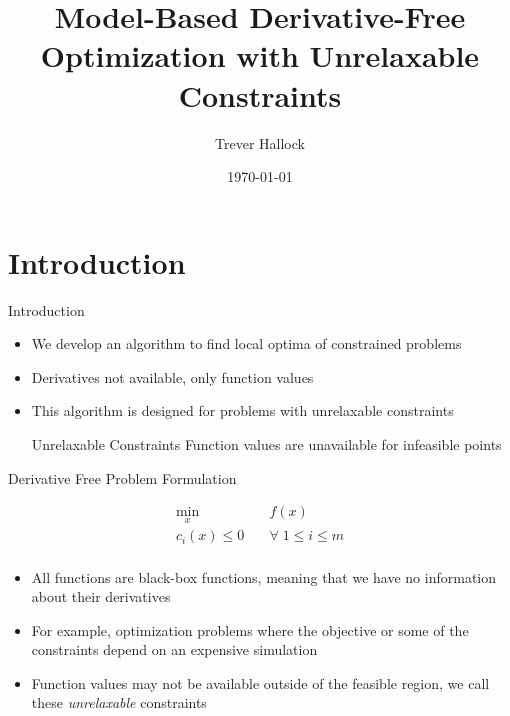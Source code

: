 \documentclass{beamer}
\begin{document}
\title{Model-Based Derivative-Free Optimization with Unrelaxable Constraints}   
\author{Trever Hallock} 
\date{\today} 

\frame{\titlepage} 

\section{Introduction}

\begin{frame}{Introduction}
	\begin{itemize}
		\item We develop an algorithm to find local optima of constrained problems
		\item Derivatives not available, only function values
		\item This algorithm is designed for problems with unrelaxable constraints
		\begin{block}{Unrelaxable Constraints}
			Function values are unavailable for infeasible points
		\end{block}
	\end{itemize}
\end{frame}


\begin{frame}{Derivative Free Problem Formulation}
\begin{center}
\label{Problem}
\begin{align*}
\min_x & \quad f(x) \\
  c_i(x) \le 0   & \quad \forall \; 1 \le i \le m \\
\end{align*}
\end{center}
	\begin{itemize}
		\item All functions are black-box functions, meaning that we have no information about their derivatives
		\item For example, optimization problems where the objective or some of the constraints depend on an expensive simulation
		\item Function values may not be available outside of the feasible region, 
		we call these \emph{unrelaxable} constraints
	\end{itemize}
\end{frame}
\end{document}
